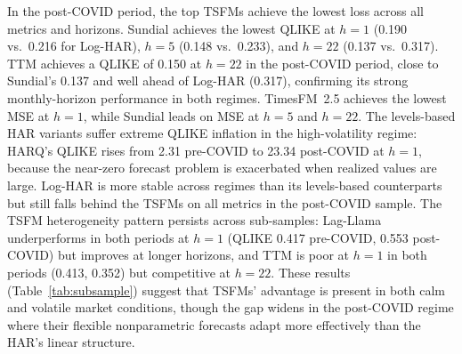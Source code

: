 \documentclass[12pt]{article}
\begin{document}
In the post-COVID period, the top TSFMs achieve the lowest loss across all metrics and horizons. Sundial achieves the lowest QLIKE at $h=1$ (0.190 vs.\ 0.216 for Log-HAR), $h=5$ (0.148 vs.\ 0.233), and $h=22$ (0.137 vs.\ 0.317). TTM achieves a QLIKE of 0.150 at $h = 22$ in the post-COVID period, close to Sundial's 0.137 and well ahead of Log-HAR (0.317), confirming its strong monthly-horizon performance in both regimes. TimesFM~2.5 achieves the lowest MSE at $h=1$, while Sundial leads on MSE at $h=5$ and $h=22$. The levels-based HAR variants suffer extreme QLIKE inflation in the high-volatility regime: HARQ's QLIKE rises from 2.31 pre-COVID to 23.34 post-COVID at $h=1$, because the near-zero forecast problem is exacerbated when realized values are large. Log-HAR is more stable across regimes than its levels-based counterparts but still falls behind the TSFMs on all metrics in the post-COVID sample. The TSFM heterogeneity pattern persists across sub-samples: Lag-Llama underperforms in both periods at $h = 1$ (QLIKE 0.417 pre-COVID, 0.553 post-COVID) but improves at longer horizons, and TTM is poor at $h = 1$ in both periods (0.413, 0.352) but competitive at $h = 22$. These results (Table~\ref{tab:subsample}) suggest that TSFMs' advantage is present in both calm and volatile market conditions, though the gap widens in the post-COVID regime where their flexible nonparametric forecasts adapt more effectively than the HAR's linear structure.


\end{document}
